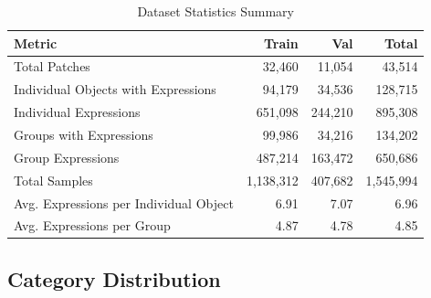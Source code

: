 \begin{table}[H]
\centering
\caption{Dataset Statistics Summary}
\label{tab:dataset_stats}
\begin{tabular}{@{}lrrr@{}}
\toprule
\textbf{Metric} & \textbf{Train} & \textbf{Val} & \textbf{Total} \\
\midrule
Total Patches & 32,460 & 11,054 & 43,514 \\
Individual Objects with Expressions & 94,179 & 34,536 & 128,715 \\
Individual Expressions & 651,098 & 244,210 & 895,308 \\
Groups with Expressions & 99,986 & 34,216 & 134,202 \\
Group Expressions & 487,214 & 163,472 & 650,686 \\
Total Samples & 1,138,312 & 407,682 & 1,545,994 \\
Avg. Expressions per Individual Object & 6.91 & 7.07 & 6.96 \\
Avg. Expressions per Group & 4.87 & 4.78 & 4.85 \\
\bottomrule
\end{tabular}
\end{table}

\subsection{Category Distribution}

